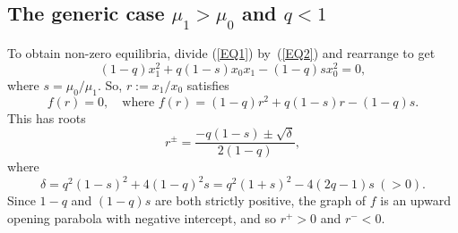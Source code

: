 \documentclass[12pt]{article}
\begin{document}
\subsection{The generic case $\mu_1>\mu_0$ and $q<1$}

%
To obtain non-zero equilibria, divide (\ref{EQ1}) by~(\ref{EQ2}) 
and rearrange to get
$$
(1-q)x_1^2 +q(1-s)x_0x_1 -(1-q)s x_0^2=0,
$$
where $s=\mu_0/\mu_1$. So, $r:=x_1/x_0$ satisfies 
\begin{equation}
f(r)=0, \quad \text{where }
f(r)=(1-q) r^2 +q(1-s)r -(1-q)s.
\label{eq:r}
\end{equation}
This has roots
\begin{equation}
r^{\pm} = \frac{-q(1-s) \pm \sqrt{\delta}}{2(1-q)},
\label{rpm}
\end{equation}
where
\begin{equation}
\delta= q^2 (1-s)^2 + 4(1-q)^2 s
= q^2 (1+s)^2 - 4(2q-1)s \ (>0).
\label{delta}
\end{equation}
Since $1-q$ and $(1-q)s$ are both strictly positive, the graph of $f$ is an 
upward opening parabola with negative intercept, and so  $r^+>0$ and
$r^-<0$. 
\end{document}
